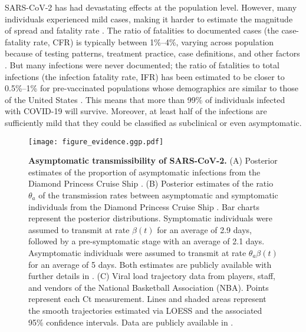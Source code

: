 \documentclass[12pt]{article}
\begin{document}
\pagebreak

SARS-CoV-2 has had devastating effects at the population level.
However, many individuals experienced mild cases, making it harder to estimate the magnitude of spread and fatality rate \citep{nogrady2020data}.
The ratio of fatalities to documented cases (the case-fatality rate, CFR) is typically between 1\%--4\%, varying across population because of testing patterns, treatment practice, case definitions, and other factors \citep{rajgor2020many,VERITY2020669,yang2020early}.
But many infections were never documented;
the ratio of fatalities to total infections (the infection fatality rate, IFR) has been estimated to be closer to 0.5\%--1\% for pre-vaccinated populations whose demographics are similar to those of the United States \citep{levin2020assessing}. 
This means that more than 99\% of individuals infected with COVID-19 will survive. 
Moreover, at least half of the infections are sufficiently mild that they could be classified as subclinical or even asymptomatic. 

\begin{figure}[!ht]
\texttt{[image: figure\_evidence.ggp.pdf]}
\caption{
\textbf{Asymptomatic transmissibility of SARS-CoV-2.}
(A) Posterior estimates of the proportion of asymptomatic infections from the Diamond Princess Cruise Ship \cite{emery2020}.
(B) Posterior estimates of the ratio $\theta_a$ of the transmission rates between asymptomatic and symptomatic individuals from the Diamond Princess Cruise Ship \cite{emery2020}.
Bar charts represent the posterior distributions.
Symptomatic individuals were assumed to transmit at rate $\beta(t)$ for an average of 2.9 days, followed by a pre-symptomatic stage with an average of 2.1 days. 
Asymptomatic individuals were assumed to transmit at rate $\theta_a \beta(t)$ for an average of 5 days.
Both estimates are publicly available with further details in \cite{emery2020}.
(C) Viral load trajectory data from players, staff, and vendors of the National Basketball Association (NBA).
Points represent each Ct measurement.
Lines and shaded areas represent the smooth trajectories estimated via LOESS and the associated 95\% confidence intervals.
Data are publicly available in \cite{Kissler2020}.
}
\label{fig:evidence}
\end{figure}
\end{document}
